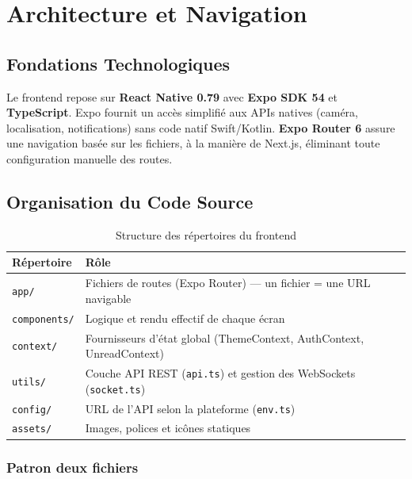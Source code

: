 \chapter{Architecture et Navigation}

\section{Fondations Technologiques}

Le frontend repose sur \textbf{React Native 0.79} avec \textbf{Expo SDK 54} et \textbf{TypeScript}. Expo fournit un accès simplifié aux APIs natives (caméra, localisation, notifications) sans code natif Swift/Kotlin. \textbf{Expo Router 6} assure une navigation basée sur les fichiers, à la manière de Next.js, éliminant toute configuration manuelle des routes.

\section{Organisation du Code Source}

\begin{table}[H]
  \centering\small
  \begin{tabularx}{\textwidth}{@{}lX@{}}
    \toprule
    \textbf{Répertoire} & \textbf{Rôle} \\
    \midrule
    \texttt{app/}        & Fichiers de routes (Expo Router) — un fichier = une URL navigable \\
    \texttt{components/} & Logique et rendu effectif de chaque écran \\
    \texttt{context/}    & Fournisseurs d'état global (ThemeContext, AuthContext, UnreadContext) \\
    \texttt{utils/}      & Couche API REST (\texttt{api.ts}) et gestion des WebSockets (\texttt{socket.ts}) \\
    \texttt{config/}     & URL de l'API selon la plateforme (\texttt{env.ts}) \\
    \texttt{assets/}     & Images, polices et icônes statiques \\
    \bottomrule
  \end{tabularx}
  \caption{Structure des répertoires du frontend}
\end{table}

\subsection{Patron deux fichiers}

